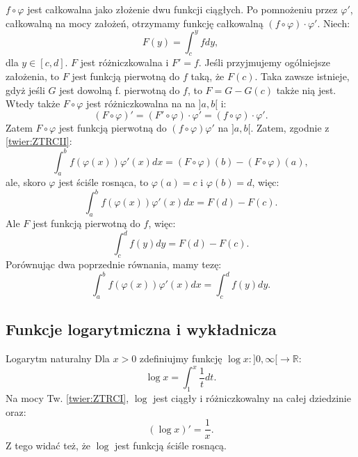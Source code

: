 \documentclass{article}
\newcounter{defi}
\numberwithin{defi}{section}
\numberwithin{defi}{section}
\newcommand{\R}{\mathbb{R}}
\newcommand{\oo}{\infty}
\begin{document}
\begin{dow}{}
    $f \circ \varphi$ jest całkowalna jako złożenie dwu funkcji ciągłych. Po pomnożeniu przez $\varphi'$, całkowalną na mocy założeń, otrzymamy funkcję całkowalną $(f\circ \varphi) \cdot \varphi'$. Niech: \begin{equation*}
        F(y) = \int_{c}^{y} f dy,
    \end{equation*}  dla $y \in [c, d]$. $F$ jest różniczkowalna i $F' = f$. Jeśli przyjmujemy ogólniejsze założenia, to $F$ jest funkcją pierwotną do $f$ taką, że $F(c)$. Taka zawsze istnieje, gdyż jeśli $G$ jest dowolną f. pierwotną do $f$, to $F = G - G(c)$ także nią jest. Wtedy także $F \circ \varphi$ jest różniczkowalna na na $]a, b[$ i:\begin{equation*}
        (F \circ \varphi)' = (F' \circ \varphi) \cdot \varphi' = (f \circ \varphi) \cdot \varphi'.
    \end{equation*} Zatem $F \circ \varphi$ jest funkcją pierwotną do $(f \circ \varphi) \varphi'$ na $]a, b[$. Zatem, zgodnie z \ref*{twier:ZTRCII}: \begin{equation*}
        \int_{a}^{b} f(\varphi(x)) \varphi'(x) dx = (F \circ \varphi)(b) - (F \circ \varphi)(a),
    \end{equation*} ale, skoro $\varphi$ jest ściśle rosnąca, to $\varphi(a) = c$ i $\varphi(b) =d$, więc:\begin{equation*}
        \int_{a}^{b} f(\varphi(x)) \varphi'(x) dx = F(d) - F(c).
    \end{equation*} Ale $F$ jest funkcją pierwotną do $f$, więc: \begin{equation*}
        \int_{c}^{d} f(y) dy  = F(d) - F(c).
    \end{equation*} Porównując dwa poprzednie równania, mamy tezę: \begin{equation*}
        \int_{a}^{b} f(\varphi(x)) \varphi'(x) dx =  \int_{c}^{d} f(y) dy.
    \end{equation*}
\end{dow}


\subsection{Funkcje logarytmiczna i wykładnicza}

\begin{defr}{Logarytm naturalny}
    Dla $x > 0$ zdefiniujmy funkcję $\log x: ]0, \oo[ \to \R$: \begin{equation}
        \log x = \int_{1}^{x} \frac{1}{t} dt.
    \end{equation} Na mocy Tw. \ref*{twier:ZTRCI}, $\log$ jest ciągły i różniczkowalny na całej dziedzinie oraz: \begin{equation}
        (\log x )' = \frac{1}{x}.
    \end{equation} Z tego widać też, że $\log$ jest funkcją ściśle rosnącą.
\end{defr}
\end{document}
